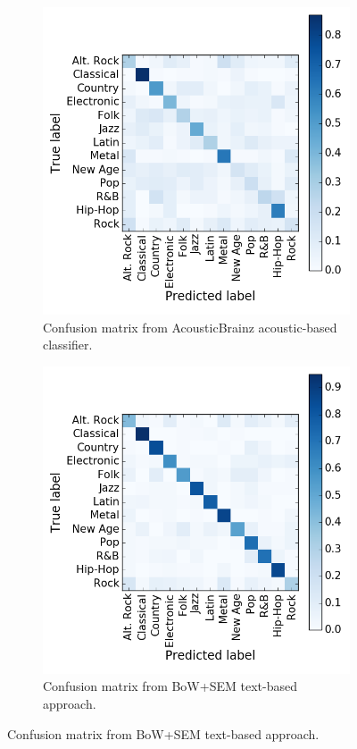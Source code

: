 

\begin{figure}[ht!]
    \centering
    \begin{subfigure}{width=.5\textwidth}
        \centering
        \includegraphics[width=.5\linewidth]{ch06_similarity_pics/confusion_audio.png}
    	\caption{Confusion matrix from AcousticBrainz acoustic-based classifier.}
        \label{fig:similarity:relation}
    \end{subfigure}
    \begin{subfigure}{width=.5\textwidth}
        \centering
        \includegraphics[width=.5\linewidth]{ch06_similarity_pics/confusion_text.png}
		\caption{Confusion matrix from BoW+SEM text-based approach.}
		\label{fig:similarity:enriched}
    \end{subfigure}
	\label{fig:similarity:confusion}
\end{figure}

